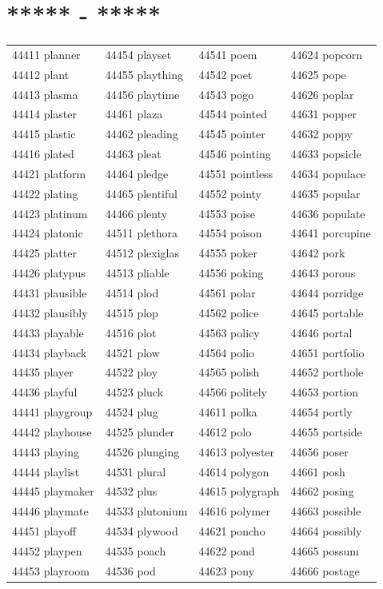 \documentclass[10pt, oneside]{book}
\begin{document}
\begin{table}[h]
	\centering
	\section*{***** - *****}
	\begin{tabular}{l l l l}
44411 planner &44454 playset &44541 poem &44624 popcorn\\
44412 plant &44455 plaything &44542 poet &44625 pope\\
44413 plasma &44456 playtime &44543 pogo &44626 poplar\\
44414 plaster &44461 plaza &44544 pointed &44631 popper\\
44415 plastic &44462 pleading &44545 pointer &44632 poppy\\
44416 plated &44463 pleat &44546 pointing &44633 popsicle\\
44421 platform &44464 pledge &44551 pointless &44634 populace\\
44422 plating &44465 plentiful &44552 pointy &44635 popular\\
44423 platinum &44466 plenty &44553 poise &44636 populate\\
44424 platonic &44511 plethora &44554 poison &44641 porcupine\\
44425 platter &44512 plexiglas &44555 poker &44642 pork\\
44426 platypus &44513 pliable &44556 poking &44643 porous\\
44431 plausible &44514 plod &44561 polar &44644 porridge\\
44432 plausibly &44515 plop &44562 police &44645 portable\\
44433 playable &44516 plot &44563 policy &44646 portal\\
44434 playback &44521 plow &44564 polio &44651 portfolio\\
44435 player &44522 ploy &44565 polish &44652 porthole\\
44436 playful &44523 pluck &44566 politely &44653 portion\\
44441 playgroup &44524 plug &44611 polka &44654 portly\\
44442 playhouse &44525 plunder &44612 polo &44655 portside\\
44443 playing &44526 plunging &44613 polyester &44656 poser\\
44444 playlist &44531 plural &44614 polygon &44661 posh\\
44445 playmaker &44532 plus &44615 polygraph &44662 posing\\
44446 playmate &44533 plutonium &44616 polymer &44663 possible\\
44451 playoff &44534 plywood &44621 poncho &44664 possibly\\
44452 playpen &44535 poach &44622 pond &44665 possum\\
44453 playroom &44536 pod &44623 pony &44666 postage\\
	\end{tabular}
 \end{table}
\end{document}
